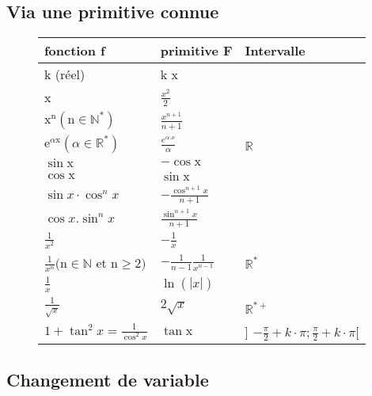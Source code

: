\subsection{Via une primitive connue}

\begin{figure}
    \centering
    \begin{tabular}{|l|l|l|}
        \hline fonction f & primitive F & Intervalle \\
        \hline k (réel) & k x & \multirow{8}{*}{$\mathbb{R}$} \\
        \hline x & $\frac{x^2}{2}$ & \\
        \hline $\mathrm{x}^{\mathrm{n}}\left(\mathrm{n} \in \mathbb{N}^*\right)$ & $\frac{x^{n+1}}{n+1}$ & \\
        \hline $\mathrm{e}^{\alpha \mathrm{x}}\left(\alpha \in \mathbb{R}^*\right)$ & $\frac{e^{\alpha . x}}{\alpha}$ & \\
        \hline $\sin \mathrm{x}$ & $-\cos \mathrm{x}$ & \\
        \hline $\cos \mathrm{x}$ & $\sin \mathrm{x}$ & \\
        \hline $\sin x \cdot \cos ^n x$ & $-\frac{\cos ^{n+1} x}{n+1}$ & \\
        \hline $\cos x . \sin ^n x$ & $\frac{\sin ^{n+1} x}{n+1}$ & \\
        \hline $\frac{1}{x^2}$ & $-\frac{1}{x}$ & \multirow{3}{*}{$\mathbb{R}^*$} \\
        \hline $\frac{1}{x^n}(\mathrm{n} \in \mathbb{N}$ et $\mathrm{n} \geq 2)$ & $-\frac{1}{n-1} \frac{1}{x^{n-1}}$ & \\
        \hline $\frac{1}{x}$ & $\ln (|x|)$ & \\
        \hline $\frac{1}{\sqrt{x}}$ & $2 \sqrt{x}$ & $\mathbb{R}^{*+}$ \\
        \hline $1+\tan ^2 x=\frac{1}{\cos ^2 x}$ & $\tan \mathrm{x}$ & ] $-\frac{\pi}{2}+k \cdot \pi ; \frac{\pi}{2}+k \cdot \pi[$ \\
        \hline
        \end{tabular}
\end{figure}

\subsection{Changement de variable}

